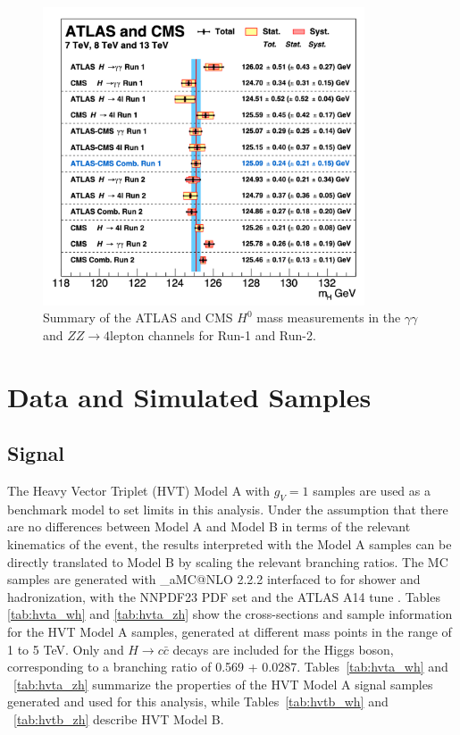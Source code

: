 \begin{figure}
	\centering
	\includegraphics[width=0.85\textwidth,origin=c]{h_boson_mass_measurement_LHC}
	\caption{
	Summary of the ATLAS and CMS $H^0$ mass measurements in the $\gamma\gamma$ and $ZZ \rightarrow 4 \mathrm{lepton}$ channels for Run-1 and Run-2.
	\cite{Aad:2015zhl, Aaboud:2018wps, Sirunyan:2017exp}
	}
	\label{fig:h_mass_measurement}
\end{figure}

\section{Data and Simulated Samples}
\label{sec:samples}


\subsection{Signal}
The Heavy Vector Triplet (HVT) Model A with $g_{V}=1$ samples are used as a benchmark model to set limits in this analysis.
Under the assumption that there are no differences between Model A and Model B in terms of the relevant kinematics of the event, the results interpreted with the Model A samples can be directly translated to Model B by scaling the relevant branching ratios.
The MC samples are generated with \_aMC@NLO 2.2.2 \cite{Alwall:2014hca} interfaced to  \cite{Sjostrand:2007gs} for shower and hadronization, with the NNPDF23 PDF set \cite{Ball:2011mu} and the ATLAS A14 tune \cite{ATL-PHYS-PUB-2014-021}. Tables \ref{tab:hvta_wh} and \ref{tab:hvta_zh} show the cross-sections and sample information for the HVT Model A samples, generated at different mass points in the range of 1 to 5 TeV.
Only \Hbb and $H\rightarrow c\bar{c}$ decays are included for the Higgs boson, corresponding to a branching ratio of 0.569 + 0.0287.
Tables~\ref{tab:hvta_wh} and ~\ref{tab:hvta_zh} summarize the properties of the HVT Model A signal samples generated and used for this analysis, while Tables~\ref{tab:hvtb_wh} and ~\ref{tab:hvtb_zh} describe HVT Model B.

